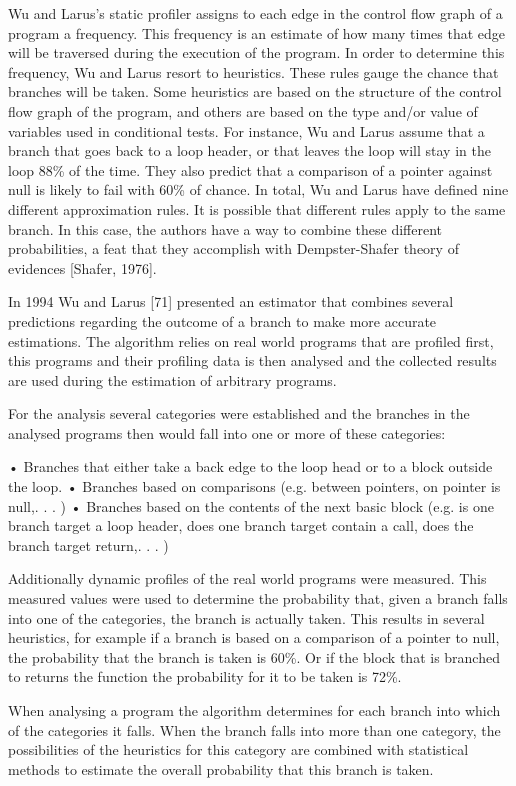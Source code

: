 Wu and Larus's static profiler assigns to each edge in the control flow graph
of a program a frequency. This frequency is an estimate of how many times that
edge will be traversed during the execution of the program. In order to determine
this frequency, Wu and Larus resort to heuristics. These rules gauge the chance that
branches will be taken. Some heuristics are based on the structure of the control flow
graph of the program, and others are based on the type and/or value of variables used
in conditional tests. For instance, Wu and Larus assume that a branch that goes back
to a loop header, or that leaves the loop will stay in the loop 88\% of the time. They
also predict that a comparison of a pointer against null is likely to fail with 60\% of
chance. In total, Wu and Larus have defined nine different approximation rules. It
is possible that different rules apply to the same branch. In this case, the authors
have a way to combine these different probabilities, a feat that they accomplish with
Dempster-Shafer theory of evidences [Shafer, 1976].

In 1994 Wu and Larus [71] presented an estimator that combines several predictions
regarding the outcome of a branch to make more accurate estimations.
The algorithm relies on real world programs that are profiled first, this programs
and their profiling data is then analysed and the collected results are
used during the estimation of arbitrary programs.

For the analysis several categories were established and the branches in the
analysed programs then would fall into one or more of these categories:

• Branches that either take a back edge to the loop head or to a block
outside the loop.
• Branches based on comparisons (e.g. between pointers, on pointer is
null,. . . )
• Branches based on the contents of the next basic block (e.g. is one
branch target a loop header, does one branch target contain a call, does
the branch target return,. . . )

Additionally dynamic profiles of the real world programs were measured. This
measured values were used to determine the probability that, given a branch
falls into one of the categories, the branch is actually taken. This results in
several heuristics, for example if a branch is based on a comparison of a pointer
to null, the probability that the branch is taken is 60\%. Or if the block that
is branched to returns the function the probability for it to be taken is 72\%.

When analysing a program the algorithm determines for each branch into
which of the categories it falls. When the branch falls into more than one
category, the possibilities of the heuristics for this category are combined with
statistical methods to estimate the overall probability that this branch is taken.

